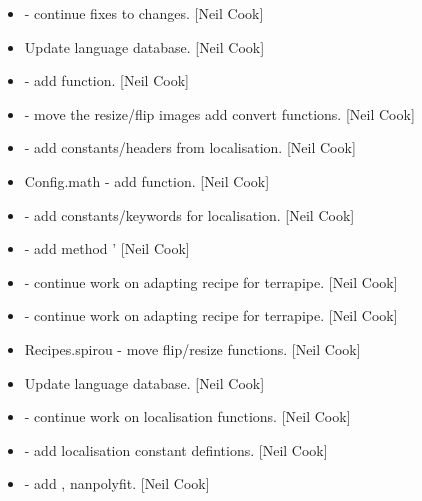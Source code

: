 \documentclass[a4paper,10pt,english]{report}
\begin{document}
\begin{itemize}
\item {} 
 - continue fixes to  changes. {[}Neil Cook{]}

\item {} 
Update language database. {[}Neil Cook{]}

\item {} 
 - add  function. {[}Neil Cook{]}

\item {} 
 - move the resize/flip images add convert functions. {[}Neil
Cook{]}

\item {} 
 - add constants/headers from localisation.
{[}Neil Cook{]}

\item {} 
Config.math - add  function. {[}Neil Cook{]}

\item {} 
 - add constants/keywords for localisation.
{[}Neil Cook{]}

\item {} 
 - add method ’ {[}Neil Cook{]}

\item {} 
 - continue work on adapting recipe for terrapipe.
{[}Neil Cook{]}

\item {} 
 - continue work on adapting recipe for terrapipe.
{[}Neil Cook{]}

\item {} 
Recipes.spirou - move flip/resize functions. {[}Neil Cook{]}

\item {} 
Update language database. {[}Neil Cook{]}

\item {} 
 - continue work on localisation
functions. {[}Neil Cook{]}

\item {} 
 - add localisation constant defintions. {[}Neil
Cook{]}

\item {} 
 - add , nanpolyfit. {[}Neil
Cook{]}


\end{itemize}
\end{document}
